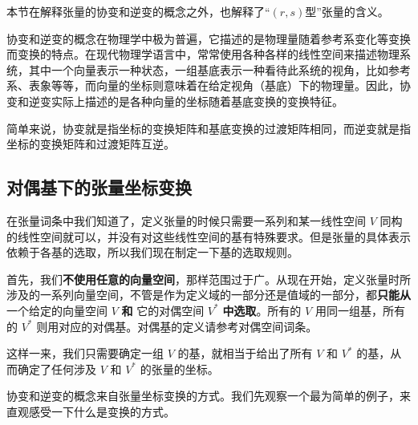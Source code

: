 

本节在解释张量的协变和逆变的概念之外，也解释了“$(r, s)$型”张量的含义。

协变和逆变的概念在物理学中极为普遍，它描述的是物理量随着参考系变化等变换而变换的特点。在现代物理学语言中，常常使用各种各样的线性空间来描述物理系统，其中一个向量表示一种状态，一组基底表示一种看待此系统的视角，比如参考系、表象等等，而向量的坐标则意味着在给定视角（基底）下的物理量。因此，协变和逆变实际上描述的是各种向量的坐标随着基底变换的变换特征。

简单来说，协变就是指坐标的变换矩阵和基底变换的过渡矩阵相同，而逆变就是指坐标的变换矩阵和过渡矩阵互逆。

\subsection{对偶基下的张量坐标变换}

在张量词条中我们知道了，定义张量的时候只需要一系列和某一线性空间 $V$ 同构的线性空间就可以，并没有对这些线性空间的基有特殊要求。但是张量的具体表示依赖于各基的选取，所以我们现在制定一下基的选取规则。

首先，我们\textbf{不使用任意的向量空间}，那样范围过于广。从现在开始，定义张量时所涉及的一系列向量空间，不管是作为定义域的一部分还是值域的一部分，都\textbf{只能从}一个给定的向量空间 $V$ \textbf{和} 它的对偶空间 $V^*$ \textbf{中选取}。所有的 $V$ 用同一组基，所有的 $V^*$ 则用对应的对偶基。对偶基的定义请参考对偶空间词条。

这样一来，我们只需要确定一组 $V$ 的基，就相当于给出了所有 $V$ 和 $V^*$ 的基，从而确定了任何涉及 $V$ 和 $V^*$ 的张量的坐标。



协变和逆变的概念来自张量坐标变换的方式。我们先观察一个最为简单的例子，来直观感受一下什么是变换的方式。


